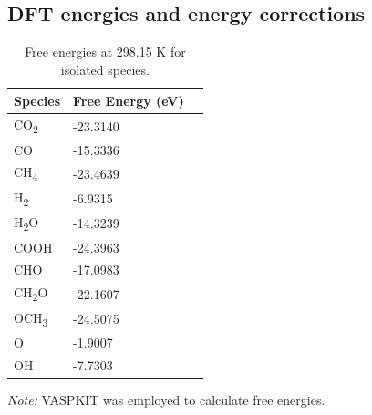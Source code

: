 \documentclass[a4paper, 12pt]{article}
\begin{document}
\subsection{DFT energies and energy corrections}
\label{supp_sec2.3_energies}

\begin{table}[htbp]
\label{supp_table2:species_free_energies}
  \caption{Free energies at 298.15 K for isolated species.}
  \center
  \small
  \begin{tabularx}{0.5\textwidth}{@{}lXr@{}}
    \toprule
    Species               & Free Energy (eV)  \\
    \midrule
    CO\textsubscript{2}   & -23.3140          \\
    CO                    & -15.3336          \\
    CH\textsubscript{4}   & -23.4639          \\
    H\textsubscript{2}    & -6.9315           \\
    H\textsubscript{2}O   & -14.3239          \\
    COOH                  & -24.3963          \\
    CHO                   & -17.0983          \\
    CH\textsubscript{2}O  & -22.1607          \\
    OCH\textsubscript{3}  & -24.5075          \\
    O                     & -1.9007           \\
    OH                    & -7.7303           \\
    \bottomrule
  \end{tabularx}

  \smallskip

  \begin{flushright}
  \begin{minipage}{\textwidth}
    \footnotesize\textit{Note:} VASPKIT \cite{wang2021vaspkit} was employed to calculate free energies.
  \end{minipage}
  \end{flushright}
\end{table}
\end{document}
